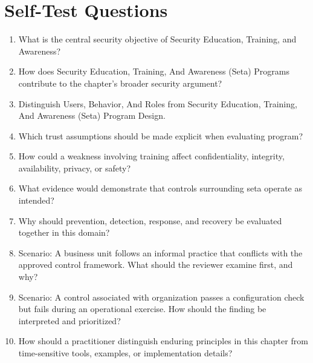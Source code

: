 \documentclass[11pt]{article}
\begin{document}
\section*{Self-Test Questions}
\begin{enumerate}
\item What is the central security objective of Security Education, Training, and Awareness?
\item How does Security Education, Training, And Awareness (Seta) Programs contribute to the chapter's broader security argument?
\item Distinguish Users, Behavior, And Roles from Security Education, Training, And Awareness (Seta) Program Design.
\item Which trust assumptions should be made explicit when evaluating program?
\item How could a weakness involving training affect confidentiality, integrity, availability, privacy, or safety?
\item What evidence would demonstrate that controls surrounding seta operate as intended?
\item Why should prevention, detection, response, and recovery be evaluated together in this domain?
\item Scenario: A business unit follows an informal practice that conflicts with the approved control framework. What should the reviewer examine first, and why?
\item Scenario: A control associated with organization passes a configuration check but fails during an operational exercise. How should the finding be interpreted and prioritized?
\item How should a practitioner distinguish enduring principles in this chapter from time-sensitive tools, examples, or implementation details?
\end{enumerate}
\end{document}
